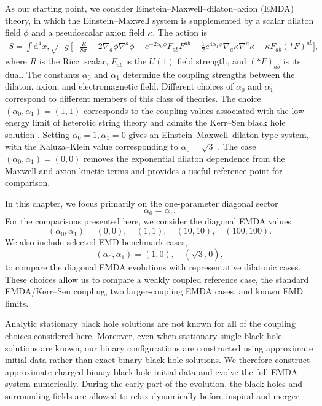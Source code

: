 As our starting point, we consider Einstein--Maxwell--dilaton--axion (EMDA) theory, in which the Einstein--Maxwell system is supplemented by a scalar dilaton field $\phi$ and a pseudoscalar axion field $\kappa$. The action is
\begin{equation}
\begin{aligned}
S = \int \mathrm{d}^4 x,\sqrt{-g}\Big[
&\frac{R}{8\pi}
-2\nabla_a\phi\nabla^a\phi
-e^{-2\alpha_0\phi}F_{ab}F^{ab} -\frac{1}{2}e^{4\alpha_1\phi}\nabla_a\kappa\nabla^a\kappa
-\kappa F_{ab}(*F)^{ab}
\Big],
\end{aligned}
\label{eq:emda_action}
\end{equation}
where $R$ is the Ricci scalar, $F_{ab}$ is the $U(1)$ field strength, and $(*F)_{ab}$ is its dual. The constants $\alpha_0$ and $\alpha_1$ determine the coupling strengths between the dilaton, axion, and electromagnetic field. 
Different choices of $\alpha_0$ and $\alpha_1$ correspond to different members of this class of theories. The choice $(\alpha_0,\alpha_1)=(1,1)$ corresponds to the coupling values associated with the low-energy limit of heterotic string theory and admits the Kerr--Sen black hole solution \cite{Sen1992,Sen1995}. Setting $\alpha_0 =1, \alpha_1=0$ gives an Einstein--Maxwell--dilaton-type system, with the Kaluza--Klein value corresponding to $\alpha_0=\sqrt{3}$ \cite{Horne1992,Mignemi1993_ChargedStringBH}. The case $(\alpha_0,\alpha_1)=(0,0)$ removes the exponential dilaton dependence from the Maxwell and axion kinetic terms and provides a useful reference point for comparison.

In this chapter, we focus primarily on the one-parameter diagonal sector
\begin{equation}
\alpha_0=\alpha_1 .
\end{equation}
For the comparisons presented here, we consider the diagonal EMDA values
\begin{equation}
(\alpha_0,\alpha_1)=(0,0),\quad (1,1),\quad (10,10),\quad (100,100).
\end{equation}
We also include selected EMD benchmark cases,
\begin{equation}
(\alpha_0,\alpha_1)=(1,0),\quad (\sqrt{3},0),
\end{equation}
to compare the diagonal EMDA evolutions with representative dilatonic cases. These choices allow us to compare a weakly coupled reference case, the standard EMDA/Kerr--Sen coupling, two larger-coupling EMDA cases, and known EMD limits.

Analytic stationary black hole solutions are not known for all of the coupling choices considered here. Moreover, even when stationary single black hole solutions are known, our binary configurations are constructed using approximate initial data rather than exact binary black hole solutions. We therefore construct approximate charged binary black hole initial data and evolve the full EMDA system numerically. During the early part of the evolution, the black holes and surrounding fields are allowed to relax dynamically before inspiral and merger.

